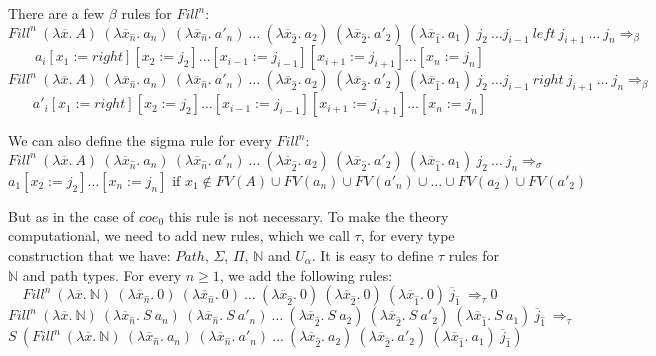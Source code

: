 \documentclass{amsart}
\theoremstyle{definition}
\theoremstyle{remark}
\newcommand{\red}{\Rightarrow}
\numberwithin{figure}{section}
\begin{document}
There are a few $\beta$ rules for $Fill^n$:
\[ Fill^n\ (\lambda \overline{x}.\ A)\ (\lambda \overline{x}_{\hat{n}}.\ a_n)\ (\lambda \overline{x}_{\hat{n}}.\ a'_n)\ \ldots\ (\lambda \overline{x}_{\hat{2}}.\ a_2)\ (\lambda \overline{x}_{\hat{2}}.\ a'_2)\ (\lambda \overline{x}_{\hat{1}}.\ a_1)\ j_2\ \ldots j_{i-1}\ left\ j_{i+1}\ \ldots\ j_n \red_\beta \]
\[ a_i[x_1 := right][x_2 := j_2] \ldots [x_{i-1} := j_{i-1}] [x_{i+1} := j_{i+1}] \ldots [x_n := j_n] \]
\[ Fill^n\ (\lambda \overline{x}.\ A)\ (\lambda \overline{x}_{\hat{n}}.\ a_n)\ (\lambda \overline{x}_{\hat{n}}.\ a'_n)\ \ldots\ (\lambda \overline{x}_{\hat{2}}.\ a_2)\ (\lambda \overline{x}_{\hat{2}}.\ a'_2)\ (\lambda \overline{x}_{\hat{1}}.\ a_1)\ j_2\ \ldots j_{i-1}\ right\ j_{i+1}\ \ldots\ j_n \red_\beta \]
\[ a'_i[x_1 := right][x_2 := j_2] \ldots [x_{i-1} := j_{i-1}] [x_{i+1} := j_{i+1}] \ldots [x_n := j_n] \]

We can also define the sigma rule for every $Fill^n$:
\[ Fill^n\ (\lambda \overline{x}.\ A)\ (\lambda \overline{x}_{\hat{n}}.\ a_n)\ (\lambda \overline{x}_{\hat{n}}.\ a'_n)\ \ldots\ (\lambda \overline{x}_{\hat{2}}.\ a_2)\ (\lambda \overline{x}_{\hat{2}}.\ a'_2)\ (\lambda \overline{x}_{\hat{1}}.\ a_1)\ j_2\ \ldots\ j_n \red_\sigma \]
\[ a_1[x_2 := j_2] \ldots [x_n := j_n] \text{ if } x_1 \notin FV(A) \cup FV(a_n) \cup FV(a'_n) \cup \ldots \cup FV(a_2) \cup FV(a'_2) \]

But as in the case of $coe_0$ this rule is not necessary.
To make the theory computational, we need to add new rules, which we call $\tau$, for every type construction that we have: $Path$, $\Sigma$, $\Pi$, $\mathbb{N}$ and $U_\alpha$.
It is easy to define $\tau$ rules for $\mathbb{N}$ and path types.
For every $n \geq 1$, we add the following rules:
\[ Fill^n\ (\lambda \overline{x}.\ \mathbb{N})\ (\lambda \overline{x}_{\hat{n}}.\ 0)\ (\lambda \overline{x}_{\hat{n}}.\ 0)\ \ldots\ (\lambda \overline{x}_{\hat{2}}.\ 0)\ (\lambda \overline{x}_{\hat{2}}.\ 0)\ (\lambda \overline{x}_{\hat{1}}.\ 0)\ \overline{j}_{\hat{1}}\ \red_\tau 0 \]
\[ Fill^n\ (\lambda \overline{x}.\ \mathbb{N})\ (\lambda \overline{x}_{\hat{n}}.\ S\ a_n)\ (\lambda \overline{x}_{\hat{n}}.\ S\ a'_n)\ \ldots\ (\lambda \overline{x}_{\hat{2}}.\ S\ a_2)\ (\lambda \overline{x}_{\hat{2}}.\ S\ a'_2)\ (\lambda \overline{x}_{\hat{1}}.\ S\ a_1)\ \overline{j}_{\hat{1}}\ \red_\tau \]
\[ S\ (Fill^n\ (\lambda \overline{x}.\ \mathbb{N})\ (\lambda \overline{x}_{\hat{n}}.\ a_n)\ (\lambda \overline{x}_{\hat{n}}.\ a'_n)\ \ldots\ (\lambda \overline{x}_{\hat{2}}.\ a_2)\ (\lambda \overline{x}_{\hat{2}}.\ a'_2)\ (\lambda \overline{x}_{\hat{1}}.\ a_1)\ \overline{j}_{\hat{1}}) \]
\end{document}
